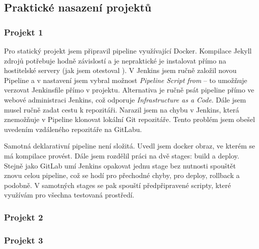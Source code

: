     \subsection{Praktické nasazení projektů}
        \subsubsection{Projekt 1}
            Pro statický projekt jsem připravil pipeline využívající Docker. Kompilace Jekyll zdrojů potřebuje hodně závislostí a je nepraktické je instalovat přímo na hostitelské servery (jak jsem otestoval ). V Jenkins jsem ručně založil novou Pipeline a v nastavení jsem vybral možnost \textit{Pipeline Script from } -- to umožňuje verzovat Jenkinsfile přímo v projektu. Alternativa je ručně psát pipeline přímo ve webové administraci Jenkins, což odporuje \textit{Infrastructure as a Code}. Dále jsem musel ručně zadat cestu k repozitáři. Narazil jsem na chybu v Jenkins, která znemožňuje v Pipeline klonovat lokální Git repozitáře. Tento problém jsem obešel uvedením vzdáleného repozitáře na GitLabu.

            Samotná deklarativní pipeline není složitá. Uvedl jsem docker obraz, ve kterém se má kompilace provést. Dále jsem rozdělil práci na dvě stages: build a deploy. Stejně jako GitLab umí Jenkins opakovat jednu stage bez nutnosti spouštět znovu celou pipeline, což se hodí pro přechodné chyby, pro deploy, rollback a podobně. V samotných stages se pak spouští předpřipravené scripty, které využívám pro všechna testovaná \CICD prostředí.

        \subsubsection{Projekt 2}
            \blind[2]
        \subsubsection{Projekt 3}
            \blind[2]
